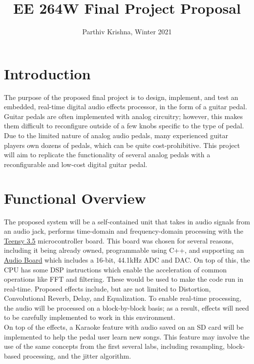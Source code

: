 \documentclass{article}
\title{EE 264W Final Project Proposal}
\author{Parthiv Krishna, Winter 2021}
\date{}
\begin{document}
\maketitle

\section{Introduction}

The purpose of the proposed final project is to design, implement, and test an embedded, real-time digital audio effects processor, in the form of a guitar pedal. Guitar pedals are often implemented with analog circuitry; however, this makes them difficult to reconfigure outside of a few knobs specific to the type of pedal. Due to the limited nature of analog audio pedals, many experienced guitar players own dozens of pedals, which can be quite cost-prohibitive. This project will aim to replicate the functionality of several analog pedals with a reconfigurable and low-cost digital guitar pedal.

\section{Functional Overview}

The proposed system will be a self-contained unit that takes in audio signals from an audio jack, performs time-domain and frequency-domain processing with the {\color{blue}\href{https://www.pjrc.com/store/teensy35.html}{Teensy 3.5}} microcontroller board. This board was chosen for several reasons, including it being already owned, programmable using C++, and supporting an {\color{blue}\href{https://www.pjrc.com/store/teensy3_audio.html}{Audio Board}} which includes a 16-bit, 44.1kHz ADC and DAC. On top of this, the CPU has some DSP instructions which enable the acceleration of common operations like FFT and filtering. These would be used to make the code run in real-time. Proposed effects include, but are not limited to Distortion, Convolutional Reverb, Delay, and Equalization. To enable real-time processing, the audio will be processed on a block-by-block basis; as a result, effects will need to be carefully implemented to work in this environment. 
\\ \newline
On top of the effects, a Karaoke feature with audio saved on an SD card will be implemented to help the pedal user learn new songs. This feature may involve the use of the same concepts from the first several labs, including resampling, block-based processing, and the jitter algorithm. 
\end{document}
